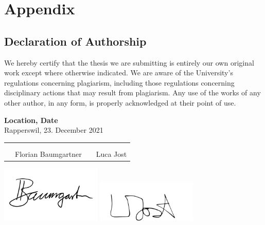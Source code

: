 \chapter{Appendix}
\clearpage

\section{Declaration of Authorship} \label{Declaration of Authorship}
We hereby certify that the thesis we are submitting is entirely our own original work except where otherwise indicated. We are aware of the University’s regulations concerning plagiarism, including those regulations concerning disciplinary actions that may result from plagiarism. Any use of the works of any other author, in any form, is properly acknowledged at their point of use.

\bigskip
\textbf{Location, Date} \\
Rapperswil, 23. December 2021

\vspace{1.2cm}
\begin{tabular}{@{}p{0.1cm}p{6cm}p{0.6cm}p{6cm}@{}}
& \hrulefill & & \hrulefill\\ \\[-0.7em]
& Florian Baumgartner & & Luca Jost\\
\end{tabular}

\includegraphics[width=4.8cm, align=t, smash=br, hshift=0.9cm, vshift=2.55cm]{appendix/Signature_Florian_Baumgartner.pdf}
\includegraphics[width=4.8cm, align=t, smash=br, hshift=8.25cm, vshift=2.77cm]{appendix/Signature_Luca_Jost.pdf}
\newpage


